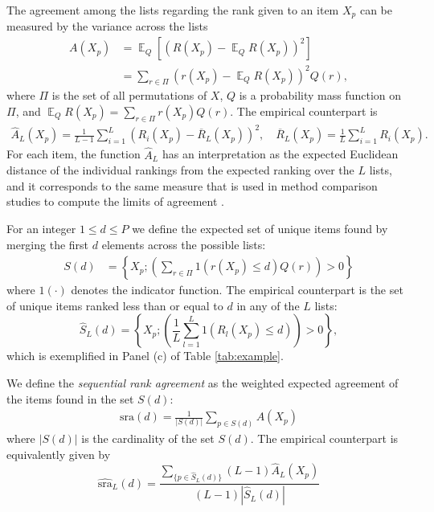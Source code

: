 \documentclass[12pt,a4paper]{article}
\newcommand{\nn}{\nonumber}
\DeclareMathOperator{\E}{\mathbb{E}}
\theoremstyle{plain}
\begin{document}
The agreement among the lists regarding the rank given to an item $X_p$
can be measured by the variance across the lists
\begin{align}
  A(X_p) &= \E_Q\left[\left(R(X_p)-\E_Q R(X_p)\right)^2\right]\\
   &= \sum_{r\in\Pi} \left(r(X_p)-\E_Q R(X_p)\right)^2 Q(r),\nn
\end{align}
where $\Pi$ is the set of all permutations of $X$, $Q$ is a
probability mass function on $\Pi$, and
$\E_Q R(X_p)=\sum_{r\in\Pi} r(X_p)Q(r)$. The empirical counterpart is
\begin{align}
\widehat{A}_L(X_p) = \frac{1}{L-1}\sum_{i=1}^L (R_i(X_p) - \overline{R}_L(X_p))^2, \quad \overline{R}_L(X_p) = \frac{1}{L}\sum_{i=1}^L R_i(X_p).\label{eq:empDistance}
\end{align}
For each item, the function $\widehat{A}_L$ has an interpretation as the expected
Euclidean distance of the individual rankings from the expected
ranking over the $L$ lists, and it corresponds to the same measure
that is used in method comparison studies to compute the limits of
agreement \citep{alt:bland:1983}.

For an integer $1\le d\le P$ we define the expected set of unique
items found by merging the first $d$ elements across the possible
lists:
\begin{align}
S(d) &= \left\{X_p; \left(\sum_{r\in\Pi} 1\left(r(X_p)\le d\right) Q(r)\right) >0\right\}\label{eq:sumset}
\end{align}
where $1(\cdot)$ denotes the indicator function.
The empirical counterpart is the set of unique items ranked less than or
equal to $d$ in any of the $L$ lists:
\begin{equation}
\widehat{S}_{L}(d) = \left\{X_p; \left(\frac{1}{L}\sum_{l=1}^L 1\left(R_l(X_p)\le d\right)\right)>0\right\},
\end{equation}
which is exemplified in Panel (c) of Table \ref{tab:example}.

We define the \emph{sequential rank agreement} as the weighted
expected agreement of the items found in the set $S(d)$:
\begin{align}
  \textrm{sra}(d) = \frac{1}{|S(d)|}\sum_{p \in S(d)}A(X_p)\label{def:sra}
\end{align}
where $|S(d)|$ is the cardinality of the set $S(d)$.
The empirical counterpart is equivalently given by
\begin{equation}
  \widehat{\textrm{sra}}_L(d) = \frac{\sum_{\{p \in \widehat{S}_{L}(d)\}}(L-1)\widehat{A}_L(X_p)}{(L-1)|\widehat {S}_{L}(d)|}\label{def:sraEst}
\end{equation}
\end{document}
